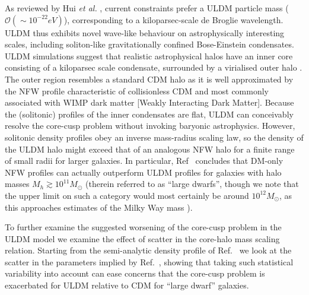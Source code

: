 \documentclass{pasa}%
\begin{document}
As reviewed by Hui {\em et al.\/} \cite{Hui:2016ltb}, current constraints prefer a ULDM particle mass ($\mathcal{O}(\sim 10^{-22}eV)$), corresponding to a kiloparsec-scale de Broglie wavelength. ULDM thus exhibits novel wave-like behaviour on astrophysically interesting scales, including soliton-like gravitationally confined Bose-Einstein condensates. ULDM simulations suggest that realistic astrophysical halos have an inner core consisting of a kiloparsec scale condensate, surrounded by a virialised outer halo \cite{Schwabe:2016rze, Veltmaat:2018dfz}. The outer region resembles a standard CDM halo as it is well approximated by the NFW \cite{Navarro:1995iw} profile characteristic of collisionless CDM and most commonly associated with WIMP dark matter [Weakly Interacting Dark Matter]. 
Because the (solitonic) profiles of the inner condensates are flat, ULDM can conceivably resolve the core-cusp problem without invoking baryonic astrophysics. However, solitonic density profiles obey an inverse mass-radius scaling law, so the density of the ULDM halo might exceed that of an analogous NFW halo for a finite range of small radii for larger galaxies. In particular, Ref~\cite{Robles:2018fur} concludes that DM-only NFW profiles can actually outperform ULDM profiles for galaxies with halo masses $M_h \gtrsim 10^{11} M_{\odot}$ (therein referred to as ``large dwarfs'', though we note that the upper limit on such a category would most certainly be around $10^{12} M_{\odot}$, as this approaches estimates of the Milky Way mass \cite{Watkins2019ApJ}).


To further examine the suggested worsening of the core-cusp problem in the ULDM model we examine the effect of scatter in the core-halo mass scaling relation. Starting from the semi-analytic density profile of Ref.~\cite{Robles:2018fur} we look at the scatter in the parameters implied by Ref.~\cite{Schive:2014hza}, showing that taking such statistical variability into account can ease concerns that the core-cusp problem is exacerbated for ULDM relative to CDM for ``large dwarf'' galaxies. 
\end{document}
